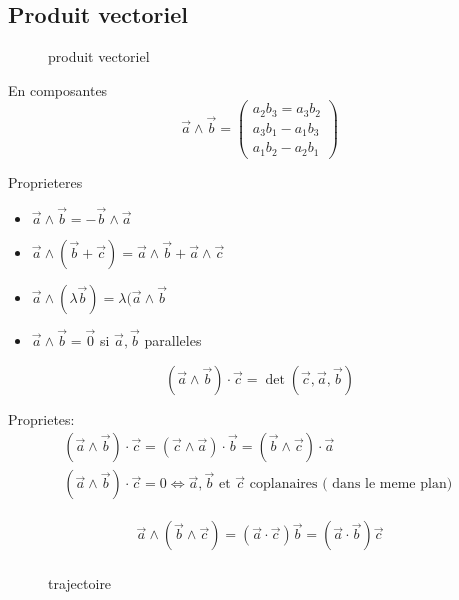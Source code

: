 \documentclass[../main.tex]{subfiles}
\begin{document}
\subsection{Produit vectoriel}
\begin{defn}\label{defn:produit_vectoriel}
\begin{figure}[ht]
    \centering
    \caption{produit vectoriel}
    \label{fig:produit-vectoriel}
\end{figure}
En composantes
\[ 
\vec{a} \land \vec{b} = 
\begin{pmatrix}
a_2b_3 = a_3b_2\\
a_3 b_1 - a_1b_3\\
a_1b_2 - a_2b_1
\end{pmatrix}
\]
\end{defn}
Proprieteres
\begin{itemize}
\item $\vec{a} \land \vec{b} = - \vec{b} \land \vec{a}$ 
\item $\vec{a} \land ( \vec{b} + \vec{c})  = \vec{a} \land \vec{b} + \vec{a} \land \vec{c}$
\item $\vec{a} \land ( \lambda \vec{b}) = \lambda(\vec{a} \land \vec{b}$ 
\item $\vec{a} \land \vec{b} = \vec{0}$ si $\vec{a}, \vec{b}$ paralleles
\end{itemize}
\begin{defn}\label{defn:produit_mixte}
	\[ 
		( \vec{a} \land \vec{b}) \cdot \vec{c} = \det (\vec{c}, \vec{a}, \vec{b})
	\]
		
\end{defn}
Proprietes:
\begin{align*}
	( \vec{a} \land \vec{b}) \cdot \vec{c} = ( \vec{c} \land \vec{a}) \cdot \vec{b} = ( \vec{b}\land \vec{c}) \cdot \vec{a}\\
	( \vec{a} \land \vec{b}) \cdot \vec{c} = 0 \iff \vec{a}, \vec{b} \text{ et } \vec{c} \text{ coplanaires ( dans le meme plan) } 
\end{align*}
\begin{defn}\label{defn:double_produit_vectoriel}
	\begin{align*}
		\vec{a} \land ( \vec{b} \land \vec{c}) = ( \vec{a} \cdot \vec{c}) \vec{b} = ( \vec{a} \cdot \vec{b}) \vec{c}\\
	\end{align*}
\end{defn}
\begin{figure}[H]
    \centering
    \caption{trajectoire}
    \label{fig:trajectoire}
\end{figure}
\end{document}

